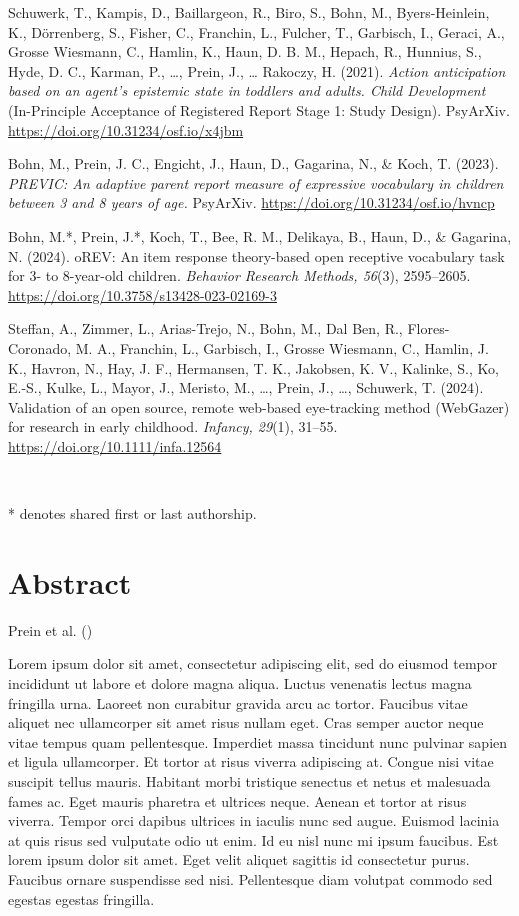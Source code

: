 \documentclass[
]{scrbook}
\begin{document}
Schuwerk, T., Kampis, D., Baillargeon, R., Biro, S., Bohn, M., Byers-Heinlein, K., Dörrenberg, S., Fisher, C., Franchin, L., Fulcher, T., Garbisch, I., Geraci, A., Grosse Wiesmann, C., Hamlin, K., Haun, D. B. M., Hepach, R., Hunnius, S., Hyde, D. C., Karman, P., \ldots, Prein, J., \ldots{} Rakoczy, H. (2021). \emph{Action anticipation based on an agent's epistemic state in toddlers and adults. Child Development} (In-Principle Acceptance of Registered Report Stage 1: Study Design). PsyArXiv. \url{https://doi.org/10.31234/osf.io/x4jbm}

Bohn, M., Prein, J. C., Engicht, J., Haun, D., Gagarina, N., \& Koch, T. (2023). \emph{PREVIC: An adaptive parent report measure of expressive vocabulary in children between 3 and 8 years of age.} PsyArXiv. \url{https://doi.org/10.31234/osf.io/hvncp}

Bohn, M.*, Prein, J.*, Koch, T., Bee, R. M., Delikaya, B., Haun, D., \& Gagarina, N. (2024). oREV: An item response theory-based open receptive vocabulary task for 3- to 8-year-old children. \emph{Behavior Research Methods, 56}(3), 2595--2605. \url{https://doi.org/10.3758/s13428-023-02169-3}

Steffan, A., Zimmer, L., Arias-Trejo, N., Bohn, M., Dal Ben, R., Flores-Coronado, M. A., Franchin, L., Garbisch, I., Grosse Wiesmann, C., Hamlin, J. K., Havron, N., Hay, J. F., Hermansen, T. K., Jakobsen, K. V., Kalinke, S., Ko, E.-S., Kulke, L., Mayor, J., Meristo, M., \ldots, Prein, J., \ldots, Schuwerk, T. (2024). Validation of an open source, remote web-based eye-tracking method (WebGazer) for research in early childhood. \emph{Infancy, 29}(1), 31--55. \url{https://doi.org/10.1111/infa.12564}

~

* denotes shared first or last authorship.

\chapter{Abstract}\label{abstract}

Prein et al. ()

Lorem ipsum dolor sit amet, consectetur adipiscing elit, sed do eiusmod tempor incididunt ut labore et dolore magna aliqua. Luctus venenatis lectus magna fringilla urna. Laoreet non curabitur gravida arcu ac tortor. Faucibus vitae aliquet nec ullamcorper sit amet risus nullam eget. Cras semper auctor neque vitae tempus quam pellentesque. Imperdiet massa tincidunt nunc pulvinar sapien et ligula ullamcorper. Et tortor at risus viverra adipiscing at. Congue nisi vitae suscipit tellus mauris. Habitant morbi tristique senectus et netus et malesuada fames ac. Eget mauris pharetra et ultrices neque. Aenean et tortor at risus viverra. Tempor orci dapibus ultrices in iaculis nunc sed augue. Euismod lacinia at quis risus sed vulputate odio ut enim. Id eu nisl nunc mi ipsum faucibus. Est lorem ipsum dolor sit amet. Eget velit aliquet sagittis id consectetur purus. Faucibus ornare suspendisse sed nisi. Pellentesque diam volutpat commodo sed egestas egestas fringilla.
\end{document}
